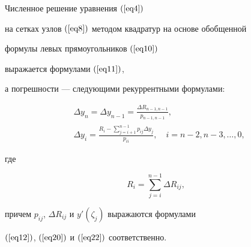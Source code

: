 \begin{thm}


Численное решение уравнения $(\ref{eq4})$


на сетках узлов $(\ref{eq8})$ методом квадратур на основе обобщенной


формулы левых прямоугольников $(\ref{eq10})$


выражается формулами $(\ref{eq11})$,


а погрешности --- следующими рекуррентными формулами\/${:}$


\begin{equation}


\label{eq23}


\begin{split}


&\Delta y_n=\Delta y_{n-1}=\frac{\Delta R_{n-1,n-1}}{p_{n-1,n-1}}, \\


&\Delta y_i=\frac{R_i-\sum\limits_{j=i+1}^{n-1}p_{ij}\Delta y_j}


{p_{ii}}, \quad i=n-2,n-3,\dotsc,0,


\end{split}


\end{equation}


где


\begin{equation}


\label{eq24}


R_i=\sum_{j=i}^{n-1}\Delta R_{ij},


\end{equation}


причем $p_{ij}$, $\Delta R_{ij}$ и $y'(\zeta_j)$ выражаются формулами


$(\ref{eq12})$, $(\ref{eq20})$ и $(\ref{eq22})$ соответственно.


\end{thm}





